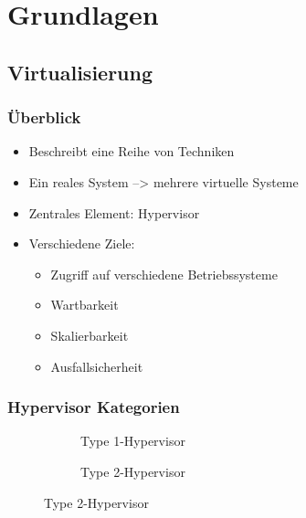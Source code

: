 \documentclass[]{beamer}
\newcommand{\inputImage}[1]{}
\begin{document}
\section{Grundlagen}
\label{sec:grundlagen}

\subsection{Virtualisierung}
\begin{frame}
\frametitle{Überblick}
    \begin{itemize}
        \item Beschreibt eine Reihe von Techniken
        \item Ein reales System --> mehrere virtuelle Systeme
        \item Zentrales Element: Hypervisor
        \item Verschiedene Ziele:
        \begin{itemize}
            \item Zugriff auf verschiedene Betriebssysteme
            \item Wartbarkeit
            \item Skalierbarkeit
            \item Ausfallsicherheit
        \end{itemize}
    \end{itemize}
\end{frame}

\begin{frame}
\frametitle{Hypervisor Kategorien}
    \begin{figure}
        \centering
        \begin{subfigure}[b]{0.49\textwidth}
            \centering
            \resizebox{0.9\linewidth}{!}{\inputImage{virt_type1.dia}}
            \caption{Type 1-Hypervisor}
            \label{fig:hypervisor_type1}
        \end{subfigure}
        \begin{subfigure}[b]{0.49\textwidth}
            \centering
            \resizebox{0.9\linewidth}{!}{\inputImage{virt_type2.dia}}
            \caption{Type 2-Hypervisor}
            \label{fig:hypervisor_type2}
        \end{subfigure}
        \label{fig:hypervisor}
    \end{figure}
\end{frame}
\end{document}

